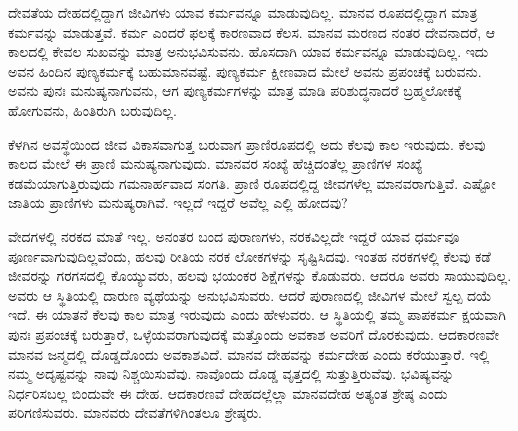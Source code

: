 ದೇವತೆಯ ದೇಹದಲ್ಲಿದ್ದಾಗ ಜೀವಿಗಳು ಯಾವ ಕರ್ಮವನ್ನೂ ಮಾಡುವುದಿಲ್ಲ. ಮಾನವ ರೂಪದಲ್ಲಿದ್ದಾಗ ಮಾತ್ರ ಕರ್ಮವನ್ನು ಮಾಡುತ್ತವೆ. ಕರ್ಮ ಎಂದರೆ ಫಲಕ್ಕೆ ಕಾರಣವಾದ ಕೆಲಸ. ಮಾನವ ಮರಣದ ನಂತರ ದೇವನಾದರೆ, ಆ ಕಾಲದಲ್ಲಿ ಕೇವಲ ಸುಖವನ್ನು ಮಾತ್ರ ಅನುಭವಿಸುವನು. ಹೊಸದಾಗಿ ಯಾವ ಕರ್ಮವನ್ನೂ ಮಾಡುವುದಿಲ್ಲ. ಇದು ಅವನ ಹಿಂದಿನ ಪುಣ್ಯಕರ್ಮಕ್ಕೆ ಬಹುಮಾನವಷ್ಟೆ. ಪುಣ್ಯಕರ್ಮ ಕ್ಷೀಣವಾದ ಮೇಲೆ ಅವನು ಪ್ರಪಂಚಕ್ಕೆ ಬರುವನು. ಅವನು ಪುನಃ ಮನುಷ್ಯನಾಗುವನು, ಆಗ ಪುಣ್ಯಕರ್ಮಗಳನ್ನು ಮಾತ್ರ ಮಾಡಿ ಪರಿಶುದ್ಧನಾದರೆ ಬ್ರಹ್ಮಲೋಕಕ್ಕೆ ಹೋಗುವನು, ಹಿಂತಿರುಗಿ ಬರುವುದಿಲ್ಲ.

ಕೆಳಗಿನ ಅವಸ್ಥೆಯಿಂದ ಜೀವ ವಿಕಾಸವಾಗುತ್ತ ಬರುವಾಗ ಪ್ರಾಣಿರೂಪದಲ್ಲಿ ಅದು ಕೆಲವು ಕಾಲ ಇರುವುದು. ಕೆಲವು ಕಾಲದ ಮೇಲೆ ಈ ಪ್ರಾಣಿ ಮನುಷ್ಯನಾಗುವುದು. ಮಾನವರ ಸಂಖ್ಯೆ ಹೆಚ್ಚಿದಂತೆಲ್ಲ ಪ್ರಾಣಿಗಳ ಸಂಖ್ಯೆ ಕಡಮೆಯಾಗುತ್ತಿರುವುದು ಗಮನಾರ್ಹವಾದ ಸಂಗತಿ. ಪ್ರಾಣಿ ರೂಪದಲ್ಲಿದ್ದ ಜೀವಗಳೆಲ್ಲ ಮಾನವರಾಗುತ್ತಿವೆ. ಎಷ್ಟೋ ಜಾತಿಯ ಪ್ರಾಣಿಗಳು ಮನುಷ್ಯರಾಗಿವೆ. ಇಲ್ಲದೆ ಇದ್ದರೆ ಅವೆಲ್ಲ ಎಲ್ಲಿ ಹೋದವು?

ವೇದಗಳಲ್ಲಿ ನರಕದ ಮಾತೆ ಇಲ್ಲ. ಅನಂತರ ಬಂದ ಪುರಾಣಗಳು, ನರಕವಿಲ್ಲದೇ ಇದ್ದರೆ ಯಾವ ಧರ್ಮವೂ ಪೂರ್ಣವಾಗುವುದಿಲ್ಲವೆಂದು, ಹಲವು ರೀತಿಯ ನರಕ ಲೋಕಗಳನ್ನು ಸೃಷ್ಟಿಸಿದವು. ಇಂತಹ ನರಕಗಳಲ್ಲಿ ಕೆಲವು ಕಡೆ ಜೀವರನ್ನು ಗರಗಸದಲ್ಲಿ ಕೊಯ್ಯುವರು, ಹಲವು ಭಯಂಕರ ಶಿಕ್ಷೆಗಳನ್ನು ಕೊಡುವರು. ಆದರೂ ಅವರು ಸಾಯುವುದಿಲ್ಲ. ಅವರು ಆ ಸ್ಥಿತಿಯಲ್ಲಿ ದಾರುಣ ವ್ಯಥೆಯನ್ನು ಅನುಭವಿಸುವರು. ಆದರೆ ಪುರಾಣದಲ್ಲಿ ಜೀವಿಗಳ ಮೇಲೆ ಸ್ವಲ್ಪ ದಯೆ ಇದೆ. ಈ ಯಾತನೆ ಕೆಲವು ಕಾಲ ಮಾತ್ರ ಇರುವುದು ಎಂದು ಹೇಳುವರು. ಆ ಸ್ಥಿತಿಯಲ್ಲಿ ತಮ್ಮ ಪಾಪಕರ್ಮ ಕ್ಷಯವಾಗಿ ಪುನಃ ಪ್ರಪಂಚಕ್ಕೆ ಬರುತ್ತಾರೆ, ಒಳ್ಳೆಯವರಾಗುವುದಕ್ಕೆ ಮತ್ತೊಂದು ಅವಕಾಶ ಅವರಿಗೆ ದೊರಕುವುದು. ಆದಕಾರಣವೇ ಮಾನವ ಜನ್ಮದಲ್ಲಿ ದೊಡ್ಡದೊಂದು ಅವಕಾಶವಿದೆ. ಮಾನವ ದೇಹವನ್ನು ಕರ್ಮದೇಹ ಎಂದು ಕರೆಯುತ್ತಾರೆ. ಇಲ್ಲಿ ನಮ್ಮ ಅದೃಷ್ಟವನ್ನು ನಾವು ನಿಶ್ಚಯಿಸುವೆವು. ನಾವೊಂದು ದೊಡ್ಡ ವೃತ್ತದಲ್ಲಿ ಸುತ್ತುತ್ತಿರುವೆವು. ಭವಿಷ್ಯವನ್ನು ನಿರ್ಧರಿಸಬಲ್ಲ ಬಿಂದುವೇ ಈ ದೇಹ. ಆದಕಾರಣವೆ ದೇಹದಲ್ಲೆಲ್ಲಾ ಮಾನವದೇಹ ಅತ್ಯಂತ ಶ್ರೇಷ್ಠ ಎಂದು ಪರಿಗಣಿಸುವರು. ಮಾನವರು ದೇವತೆಗಳಿಗಿಂತಲೂ ಶ್ರೇಷ್ಠರು.

